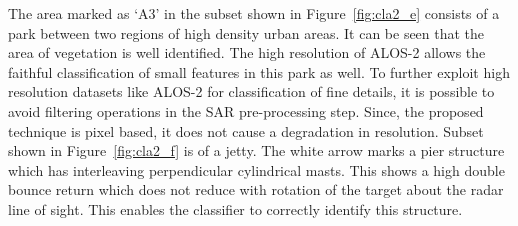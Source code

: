 The area marked as `A3' in the subset shown in Figure~\ref{fig:cla2_e} consists of a park between two regions of high density urban areas. It can be seen that the area of vegetation is well identified. The high resolution of ALOS-2 allows the faithful classification of small features in this park as well.  To further exploit high resolution datasets like ALOS-2 for classification of fine details, it is possible to avoid filtering operations in the SAR pre-processing step. Since, the proposed technique is pixel based, it does not cause a degradation in resolution.  
Subset shown in Figure~\ref{fig:cla2_f} is of a jetty. The white arrow marks a pier structure which has interleaving perpendicular cylindrical masts. This shows a high double bounce return which does not reduce with rotation of the target about the radar line of sight. This enables the classifier to correctly identify this structure. %







%
%



